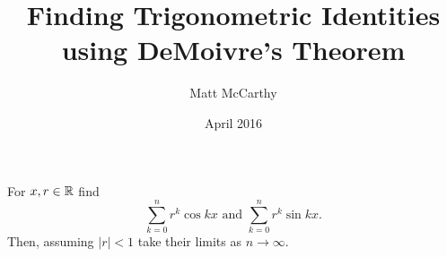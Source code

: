 \documentclass[notitlepage]{simple}
\author{Matt McCarthy}
\title{Finding Trigonometric Identities using DeMoivre's Theorem}
\date{April 2016}
\begin{document}
\maketitle

\begin{problem*}
	For $x,r\in\mathbb{R}$ find
	\[
		\sum_{k=0}^n r^k\cos kx \text{ and } \sum_{k=0}^n r^k\sin kx.
	\]
	Then, assuming $|r|<1$ take their limits as $n\rightarrow\infty$.
\end{problem*}
\end{document}

